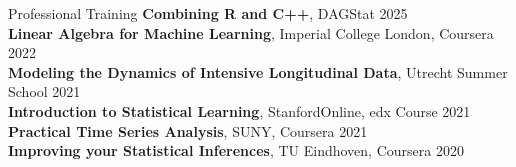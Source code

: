 \documentclass{resume} %
\begin{document}
\begin{rSection}{Professional Training}
\textbf{Combining R and C++}, DAGStat \hfill 2025 \\
\textbf{Linear Algebra for Machine Learning}, Imperial College London, Coursera \hfill 2022 \\
\textbf{Modeling the Dynamics of Intensive Longitudinal Data}, Utrecht Summer School \hfill 2021 \\
\textbf{Introduction to Statistical Learning}, StanfordOnline, edx Course \hfill 2021 \\
\textbf{Practical Time Series Analysis}, SUNY, Coursera \hfill 2021 \\ 
\textbf{Improving your Statistical Inferences}, TU Eindhoven, Coursera \hfill 2020 \\

\end{rSection}
\end{document}
